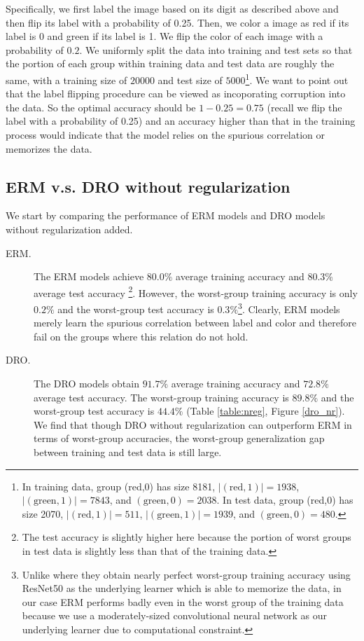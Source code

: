 \documentclass{article}
\begin{document}
Specifically, we first label the image based on its digit as described above and then flip its label with a probability of 0.25. Then, we color a image as red if its label is 0 and green if its label is 1. We flip the color of each image with a probability of $0.2$. We uniformly split the data into training and test sets so that the portion of each group within training data and test data are roughly the same, with a training size of $20000$ and test size of $5000$\footnote{In training data, group (red,0) has size 8181, $|(\text{red},1)|=1938$, $|(\text{green}, 1)|=7843$, and $(\text{green},0)=2038$. In test data, group (red,0) has size 2070, $|(\text{red},1)|=511$, $|(\text{green}, 1)|=1939$, and $(\text{green},0)=480$.}. We want to point out that the label flipping procedure can be viewed as incoporating corruption into the data. So the optimal accuracy should be $1-0.25=0.75$ (recall we flip the label with a probability of 0.25) and an accuracy higher than that in the training process would indicate that the model relies on the spurious correlation or memorizes the data.

\subsection{ERM v.s. DRO without regularization}
We start by comparing the performance of ERM models and DRO models without regularization added.
\begin{description}
    \item[ERM.] The ERM models achieve $80.0\%$ average training accuracy and $80.3\%$ average test accuracy \footnote{The test accuracy is slightly higher here because the portion of worst groups in test data is slightly less than that of the training data.}. However, the worst-group training accuracy is only $0.2\%$ and the worst-group test accuracy is $0.3\%$\footnote{Unlike \cite{groupdro} where they obtain nearly perfect worst-group training accuracy using ResNet50 as the underlying learner which is able to memorize the data, in our case ERM performs badly even in the worst group of the training data because we use a moderately-sized convolutional neural network as our underlying learner due to computational constraint.}. Clearly, ERM models merely learn the spurious correlation between label and color and therefore fail on the groups where this relation do not hold. 
    \item[DRO.] The DRO models obtain $91.7\%$ average training accuracy and $72.8\%$ average test accuracy. The worst-group training accuracy is $89.8\%$ and the worst-group test accuracy is $44.4\%$ (Table \ref{table:nreg}, Figure \ref{dro_nr}). We find that though DRO without regularization can outperform ERM in terms of worst-group accuracies, the worst-group generalization gap between training and test data is still large.
\end{description}
\end{document}
